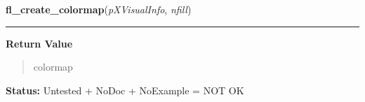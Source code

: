     \label{xformslib:library:fl_create_colormap}

    \vspace{0.5ex}

\hspace{.8\funcindent}\begin{boxedminipage}{\funcwidth}

    \raggedright \textbf{fl\_create\_colormap}(\textit{pXVisualInfo}, \textit{nfill})

    \vspace{-1.5ex}

    \rule{\textwidth}{0.5\fboxrule}
\setlength{\parskip}{2ex}
\setlength{\parskip}{1ex}
      \textbf{Return Value}
    \vspace{-1ex}

      \begin{quote}
      colormap

      \end{quote}

\textbf{Status:} Untested + NoDoc + NoExample = NOT OK



    \end{boxedminipage}

    \label{xformslib:library:fl_wingeometry}

    \vspace{0.5ex}

